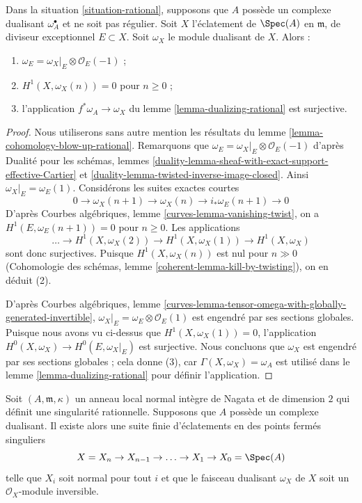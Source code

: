 \begin{lemma} \label{lemma-dualizing-blow-up-rational} Dans la situation \ref{situation-rational}, supposons que $A$ possède un complexe dualisant $\omega_A^\bullet$ et ne soit pas régulier. Soit $X$ l'éclatement de $\Spec(A)$ en $\mathfrak m$, de diviseur exceptionnel $E \subset X$. Soit $\omega_X$ le module dualisant de $X$. Alors : \begin{enumerate} \item $\omega_E = \omega_X|_E \otimes \mathcal{O}_E(-1)$ ; \item $H^1(X, \omega_X(n)) = 0$ pour $n \geq 0$ ; \item l'application $f^*\omega_A \to \omega_X$ du lemme \ref{lemma-dualizing-rational} est surjective. \end{enumerate} \end{lemma}

\begin{proof} Nous utiliserons sans autre mention les résultats du lemme \ref{lemma-cohomology-blow-up-rational}. Remarquons que $\omega_E = \omega_X|_E \otimes \mathcal{O}_E(-1)$ d'après Dualité pour les schémas, lemmes \ref{duality-lemma-sheaf-with-exact-support-effective-Cartier} et \ref{duality-lemma-twisted-inverse-image-closed}. Ainsi $\omega_X|_E = \omega_E(1)$. Considérons les suites exactes courtes $$
0 \to \omega_X(n + 1) \to \omega_X(n) \to i_*\omega_E(n + 1) \to 0
$$ D'après Courbes algébriques, lemme \ref{curves-lemma-vanishing-twist}, on a $H^1(E, \omega_E(n + 1)) = 0$ pour $n \geq 0$. Les applications $$
\ldots \to H^1(X, \omega_X(2)) \to H^1(X, \omega_X(1)) \to H^1(X, \omega_X)
$$ sont donc surjectives. Puisque $H^1(X, \omega_X(n))$ est nul pour $n \gg 0$ (Cohomologie des schémas, lemme \ref{coherent-lemma-kill-by-twisting}), on en déduit (2).

\medskip\noindent D'après Courbes algébriques, lemme \ref{curves-lemma-tensor-omega-with-globally-generated-invertible}, $\omega_X|_E = \omega_E \otimes \mathcal{O}_E(1)$ est engendré par ses sections globales. Puisque nous avons vu ci-dessus que $H^1(X, \omega_X(1)) = 0$, l'application $H^0(X, \omega_X) \to H^0(E, \omega_X|_E)$ est surjective. Nous concluons que $\omega_X$ est engendré par ses sections globales ; cela donne (3), car $\Gamma(X, \omega_X) = \omega_A$ est utilisé dans le lemme \ref{lemma-dualizing-rational} pour définir l'application. \end{proof}

\begin{lemma} \label{lemma-rational-to-gorenstein} Soit $(A, \mathfrak m, \kappa)$ un anneau local normal intègre de Nagata et de dimension $2$ qui définit une singularité rationnelle. Supposons que $A$ possède un complexe dualisant. Il existe alors une suite finie d'éclatements en des points fermés singuliers $$
X = X_n \to X_{n - 1} \to \ldots \to X_1 \to X_0 = \Spec(A)
$$ telle que $X_i$ soit normal pour tout $i$ et que le faisceau dualisant $\omega_X$ de $X$ soit un $\mathcal{O}_X$-module inversible. \end{lemma}

